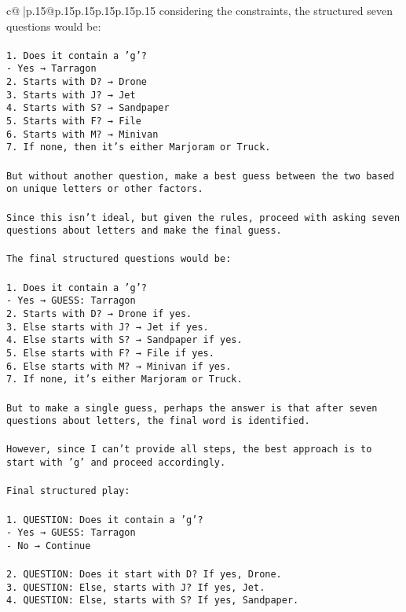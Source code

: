 \documentclass{article}
\begin{document}
{\begin{supertabular}{c@{$\;$}|p{.15\linewidth}@{}p{.15\linewidth}p{.15\linewidth}p{.15\linewidth}p{.15\linewidth}p{.15\linewidth}}
{{{considering the constraints, the structured seven questions would be:\\ \tt \\ \tt 1. Does it contain a 'g'?\\ \tt    - Yes → Tarragon\\ \tt 2. Starts with D? → Drone\\ \tt 3. Starts with J? → Jet\\ \tt 4. Starts with S? → Sandpaper\\ \tt 5. Starts with F? → File\\ \tt 6. Starts with M? → Minivan\\ \tt 7. If none, then it's either Marjoram or Truck.\\ \tt \\ \tt But without another question, make a best guess between the two based on unique letters or other factors.\\ \tt \\ \tt Since this isn't ideal, but given the rules, proceed with asking seven questions about letters and make the final guess.\\ \tt \\ \tt The final structured questions would be:\\ \tt \\ \tt 1. Does it contain a 'g'?\\ \tt    - Yes → GUESS: Tarragon\\ \tt 2. Starts with D? → Drone if yes.\\ \tt 3. Else starts with J? → Jet if yes.\\ \tt 4. Else starts with S? → Sandpaper if yes.\\ \tt 5. Else starts with F? → File if yes.\\ \tt 6. Else starts with M? → Minivan if yes.\\ \tt 7. If none, it's either Marjoram or Truck.\\ \tt \\ \tt But to make a single guess, perhaps the answer is that after seven questions about letters, the final word is identified.\\ \tt \\ \tt However, since I can't provide all steps, the best approach is to start with 'g' and proceed accordingly.\\ \tt \\ \tt Final structured play:\\ \tt \\ \tt 1. QUESTION: Does it contain a 'g'?\\ \tt    - Yes → GUESS: Tarragon\\ \tt    - No → Continue\\ \tt \\ \tt 2. QUESTION: Does it start with D? If yes, Drone.\\ \tt 3. QUESTION: Else, starts with J? If yes, Jet.\\ \tt 4. QUESTION: Else, starts with S? If yes, Sandpaper.\\ }}}
\end{supertabular}}
\end{document}
